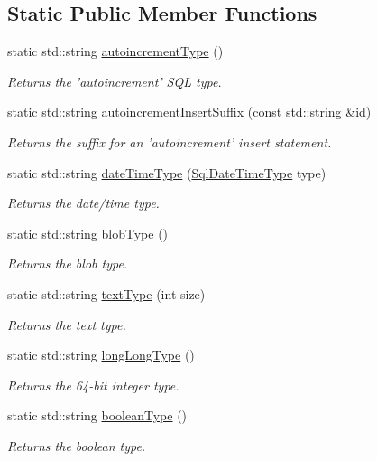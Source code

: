 \subsection*{Static Public Member Functions}
\begin{DoxyCompactItemize}
\item 
static std\+::string \hyperlink{classdbo_1_1traits_1_1_sql_postgres_types_a4126485ad2defdb510abc04b24ab20a9}{autoincrement\+Type} ()
\begin{DoxyCompactList}\small\item\em Returns the 'autoincrement' S\+Q\+L type. \end{DoxyCompactList}\item 
static std\+::string \hyperlink{classdbo_1_1traits_1_1_sql_postgres_types_a7a19608314c899a3455f650c98036e0b}{autoincrement\+Insert\+Suffix} (const std\+::string \&\hyperlink{namespacedbo_a8d25907296ae8360b3120b7492022c1d}{id})
\begin{DoxyCompactList}\small\item\em Returns the suffix for an 'autoincrement' insert statement. \end{DoxyCompactList}\item 
static std\+::string \hyperlink{classdbo_1_1traits_1_1_sql_postgres_types_a21d4da1f854986d3c941f1438c95a891}{date\+Time\+Type} (\hyperlink{classdbo_1_1traits_1_1_sql_postgres_types_ae4fe0e8ccef92e4330e470f407cabdea}{Sql\+Date\+Time\+Type} type)
\begin{DoxyCompactList}\small\item\em Returns the date/time type. \end{DoxyCompactList}\item 
static std\+::string \hyperlink{classdbo_1_1traits_1_1_sql_postgres_types_a787c62ab1b95709780c4196d541e210e}{blob\+Type} ()
\begin{DoxyCompactList}\small\item\em Returns the blob type. \end{DoxyCompactList}\item 
static std\+::string \hyperlink{classdbo_1_1traits_1_1_sql_postgres_types_abfa349db317aea7e888b6378301f9c6d}{text\+Type} (int size)
\begin{DoxyCompactList}\small\item\em Returns the text type. \end{DoxyCompactList}\item 
static std\+::string \hyperlink{classdbo_1_1traits_1_1_sql_postgres_types_a3a0bf17921987a36e44d0577cdad840d}{long\+Long\+Type} ()
\begin{DoxyCompactList}\small\item\em Returns the 64-\/bit integer type. \end{DoxyCompactList}\item 
static std\+::string \hyperlink{classdbo_1_1traits_1_1_sql_postgres_types_a4546fb422b2f00668453ea8eb7b4c17b}{boolean\+Type} ()
\begin{DoxyCompactList}\small\item\em Returns the boolean type. \end{DoxyCompactList}\end{DoxyCompactItemize}


